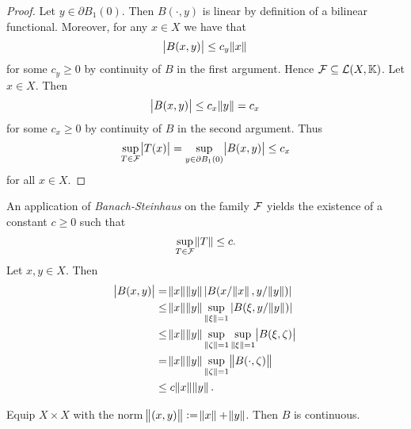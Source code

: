 \begin{enumerate}[label = \textbf{Exercise \arabic*.},wide = 0pt, itemsep = 1.5ex]
\begin{enumerate}[label = \textbf{\alph*.},wide = 0pt, itemsep = 1.5ex]
				\begin{proof}
					Let $y \in \partial B_1(0)$. Then $B(\cdot,y)$ is linear by definition of a bilinear functional. Moreover, for any $x \in X$ we have that
					\begin{equation*}
						\abs{B(x,y)} \leq c_y \norm{x}
					\end{equation*}
					\noindent for some $c_y \geq 0$ by continuity of $B$ in the first argument. Hence $\mathcal{F} \subseteq \mathcal{L}(X,\mathbb{K})$. Let $x \in X$. Then
					\begin{equation*}
						\abs{B(x,y)} \leq c_x \norm{y} = c_x
					\end{equation*}
					\noindent for some $c_x \geq 0$ by continuity of $B$ in the second argument. Thus
					\begin{equation*}
						\sup_{T \in \Fcal}\abs{T(x)} = \sup_{y \in \partial B_1(0)} \abs{B(x,y)} \leq c_x
					\end{equation*}
					\noindent for all $x \in X$.
				\end{proof}

				An application of \emph{Banach-Steinhaus} on the family $\mathcal{F}$ yields the existence of a constant $c \geq 0$ such that
				\begin{equation*}
					\sup_{T \in \Fcal}\norm{T} \leq c.
				\end{equation*}
				Let $x,y \in X$. Then
				\begin{align*}
					\abs{B(x,y)} &= \norm{x}\norm{y} \abs[0]{B(x/\norm{x},y/\norm{y})}\\
					&\leq \norm{x}\norm{y} \sup_{\norm[0]{\xi} = 1}\abs[0]{B(\xi,y/\norm{y})}\\
					&\leq \norm{x}\norm{y} \sup_{\norm[0]{\zeta} = 1} \sup_{\norm[0]{\xi} = 1} \abs{B(\xi,\zeta)}\\
					&= \norm{x}\norm{y} \sup_{\norm[0]{\zeta} = 1}\norm{B(\cdot,\zeta)}\\
					&\leq c\norm{x}\norm{y}.
				\end{align*}

				\begin{lemma}
					Equip $X \times X$ with the norm $\norm{(x,y)} := \norm{x} + \norm{y}$. Then $B$ is continuous.
				\end{lemma}


\end{enumerate}
\end{enumerate}
